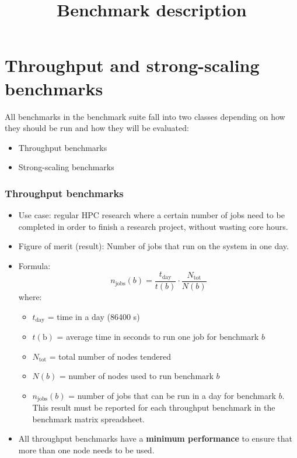 \documentclass{article}
\begin{document}
\title{Benchmark description}

\maketitle

\section*{Throughput and strong-scaling benchmarks}

All benchmarks in the benchmark suite fall into two classes depending
on how they should be run and how they will be evaluated:

\begin{itemize}
\item Throughput benchmarks
\item Strong-scaling benchmarks
\end{itemize}

\subsubsection*{Throughput benchmarks}

\begin{itemize}
    \item Use case: regular HPC research where a certain number of jobs need to be completed in order to finish a research project, without wasting core hours. 
    \item Figure of merit (result): Number of jobs that run on the system in one day.
    \item Formula:
    \begin{equation}
        n_{\textrm{jobs}}(b) = \frac{t_{\textrm{day}}}{t(b)} \cdot \frac{N_{\textrm{tot}}}{N(b)}       
    \end{equation}
    where:
    \begin{itemize}
        \item $t_{\textrm{day}}$ = time in a day (86400 s)
        \item $t(\textrm{b})$ = average time in seconds to run one job for benchmark $b$
        \item $N_{\textrm{tot}}$ = total number of nodes tendered
        \item $N(b)$ = number of nodes used to run benchmark $b$
        \item $n_{\textrm{jobs}}(b)$ = number of jobs that can be run in a day for benchmark $b$. This result must be reported for each throughput benchmark in the benchmark matrix spreadsheet.
    \end{itemize}
    \item All throughput benchmarks have a \textbf{minimum performance} to ensure that more than one node needs to be used.

\end{itemize}
\end{document}
